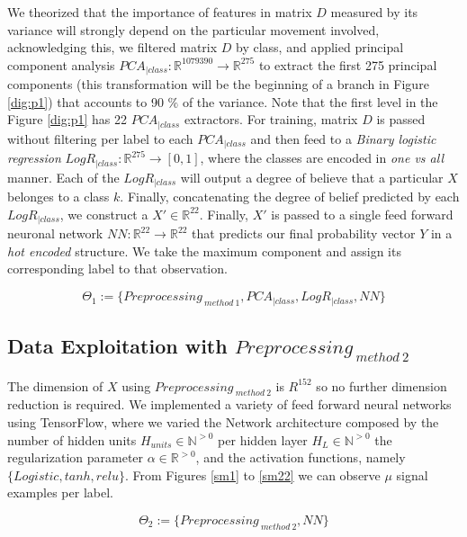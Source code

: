 We theorized that the importance of features in matrix $D$ measured by its variance will strongly depend on the particular movement involved, acknowledging this, we filtered matrix $D$ by class, and applied principal component analysis $PCA_{|class}: \mathbb{R}^{1079390} \longrightarrow \mathbb{R}^{275}$ to extract the first 275 principal components (this transformation will be the beginning of a branch in Figure \ref{dig:p1}) that accounts to 90 $\%$ of the variance. Note that the first level in the Figure \ref{dig:p1} has 22 $PCA_{|class}$ extractors. For training, matrix $D$ is passed without filtering per label to each $PCA_{|class}$ and then feed to a \textit{Binary logistic regression} $LogR_{|class}: \mathbb{R}^{275} \longrightarrow [0,1]$, where the classes are encoded in \textit{one vs all} manner. Each of the $LogR_{|class}$ will output a degree of believe that a particular $X$ belonges to a class $k$. Finally, concatenating the degree of belief predicted by each $LogR_{|class}$, we construct a $X' \in \mathbb{R}^{22}$. Finally, $X'$ is passed to a single feed forward neuronal network $NN: \mathbb{R}^{22} \longrightarrow  \mathbb{R}^{22} $ that predicts our final probability vector $Y$ in a \textit{hot encoded} structure. We take the maximum component and assign its corresponding label to that observation.


\begin{equation}
\Theta_{1}:= \{ Preprocessing_{ \ method \ 1},PCA_{|class},LogR_{|class},NN \}
\label{eq:1}
\end{equation}


\subsection{Data Exploitation with $Preprocessing_{ \ method \ 2}$}
The dimension of $X$ using $Preprocessing_{ \ method \ 2}$ is $R^{152}$ so no further dimension reduction is required. We implemented a variety of feed forward neural networks using TensorFlow, where we varied the Network architecture composed by the number of hidden units $H_{units} \in \mathbb{N}^{>0}$ per hidden layer $H_{L} \in \mathbb{N}^{>0}$ the regularization parameter $\alpha \in \mathbb{R}^{>0}$, and the activation functions, namely $ \{  Logistic, tanh, relu \}$. From Figures \ref{sm1} to  \ref{sm22} we can observe $\mu$ signal examples per label.

\begin{equation}
\Theta_{2}:= \{ Preprocessing_{ \ method \ 2},NN \}
\label{eq:2}
\end{equation}


